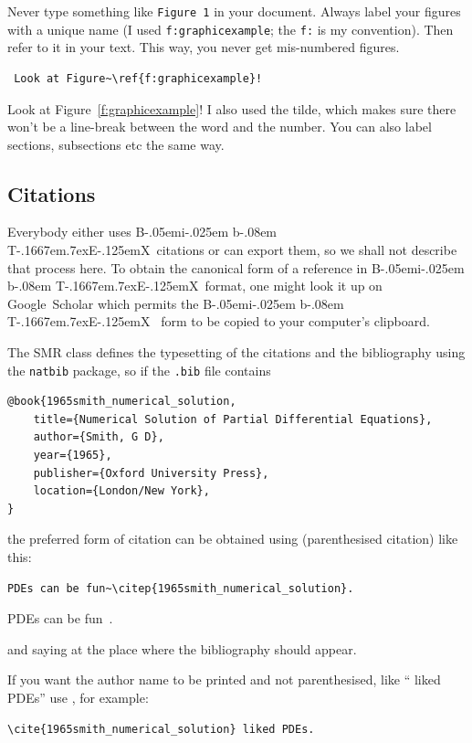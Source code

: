 \documentclass{SMR}
\begin{document}
Never type something like \texttt{Figure 1} in your document.
Always label your figures with a unique name (I used \texttt{f:graphicexample};
the \texttt{f:} is my convention). Then refer to it in your text.
This way, you never get mis-numbered figures.

\begin{verbatim}
 Look at Figure~\ref{f:graphicexample}!
\end{verbatim}

Look at Figure~\ref{f:graphicexample}!
I also used the tilde, which makes sure there won't be a line-break between
the word and the number. You can also label sections, subsections etc
the same way.

\subsection{Citations}

\def\BibTeX{{\rm B\kern-.05em{\sc i\kern-.025em b}\kern-.08em
    T\kern-.1667em\lower.7ex\hbox{E}\kern-.125emX}}
Everybody either uses \BibTeX\ citations or can export them, so we shall not
describe that process here. To obtain the canonical form of a reference in
\BibTeX\ format, one might look it up on Google~Scholar which permits the \BibTeX 
\ form to be copied to your computer's clipboard.

The SMR class defines the typesetting of the citations and the bibliography
using the \texttt{natbib} package, so if the \texttt{.bib} file contains

\begin{verbatim}
@book{1965smith_numerical_solution,
	title={Numerical Solution of Partial Differential Equations},
	author={Smith, G D},
	year={1965},
	publisher={Oxford University Press},
	location={London/New York},
}
\end{verbatim}

the preferred form of citation can be obtained using 
(parenthesised citation) like this:

\begin{verbatim}
PDEs can be fun~\citep{1965smith_numerical_solution}.
\end{verbatim}

PDEs can be fun~\citep{1965smith_numerical_solution}.

and saying  at the place where
the bibliography should appear.

If you want the author name to be printed and not parenthesised, 
like ``\cite{1965smith_numerical_solution} liked PDEs''
use , for example:
\begin{verbatim}
\cite{1965smith_numerical_solution} liked PDEs.
\end{verbatim}
\end{document}
